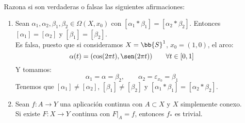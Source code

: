 \begin{ejercicio}
    Razona si son verdaderas o falsas las siguientes afirmaciones:
    \begin{enumerate}[label=\alph*)]
        \item Sean $\alpha_1,\alpha_2,\beta_1,\beta_2\in \Omega(X,x_0)$  con $[\alpha_1\ast \beta_1] = [\alpha_2\ast \beta_2]$. Entonces $[\alpha_1] = [\alpha_2]$ y $[\beta_1] = [\beta_2]$.\\

            Es falsa, puesto que si consideramos $X=\bb{S}^1$, $x_0 =(1,0)$, el arco:
            \begin{equation*}
                \alpha(t) = (\cos(2\pi t), \sen(2\pi t)) \qquad \forall t\in [0,1]
            \end{equation*}
            Y tomamos:
            \begin{equation*}
                \alpha_1 = \alpha = \beta_2, \qquad \alpha_2 = \varepsilon_{x_0} = \beta_1
            \end{equation*}
            Tenemos que $[\alpha_1] \neq [\alpha_2]$, $[\beta_1]\neq[\beta_2]$ y $[\alpha_1\ast \beta_1] = [\alpha_2\ast \beta_2]$.
        \item Sean $f:A\to Y$ una aplicación continua con $A\subset X$ y $X$ simplemente conexo. Si existe $F:X\to Y$ continua con $F\big|_A = f$, entonces $f_\ast$ es trivial.\\


\end{enumerate}
\end{ejercicio}
